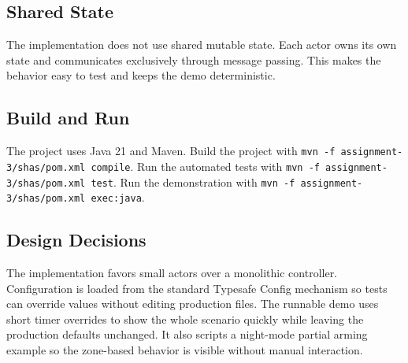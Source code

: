 \subsection{Shared State}
The implementation does not use shared mutable state.
Each actor owns its own state and communicates exclusively through message passing.
This makes the behavior easy to test and keeps the demo deterministic.

\subsection{Build and Run}
The project uses Java 21 and Maven.
Build the project with \texttt{mvn -f assignment-3/shas/pom.xml compile}.
Run the automated tests with \texttt{mvn -f assignment-3/shas/pom.xml test}.
Run the demonstration with \texttt{mvn -f assignment-3/shas/pom.xml exec:java}.

\subsection{Design Decisions}
The implementation favors small actors over a monolithic controller.
Configuration is loaded from the standard Typesafe Config mechanism so tests can override values without editing production files.
The runnable demo uses short timer overrides to show the whole scenario quickly while leaving the production defaults unchanged.
It also scripts a night-mode partial arming example so the zone-based behavior is visible without manual interaction.
